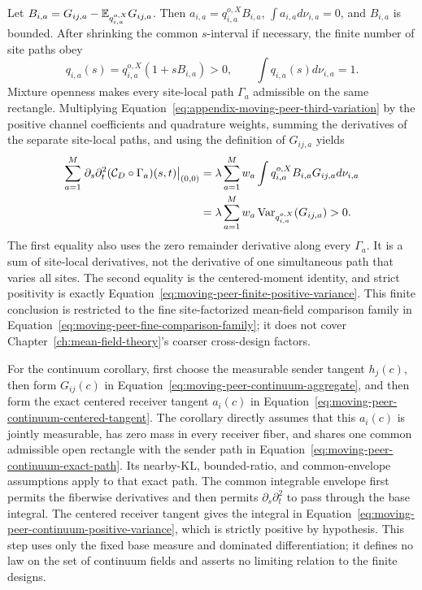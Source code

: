 Let \(B_{i,a}=G_{ij,a}-\mathbb E_{q_{i,a}^{o,X}}G_{ij,a}\). Then \(a_{i,a}=q_{i,a}^{o,X}B_{i,a}\), \(\int a_{i,a}d\nu_{i,a}=0\), and \(B_{i,a}\) is bounded. After shrinking the common \(s\)-interval if necessary, the finite number of site paths obey
\begin{equation}
q_{i,a}(s)=q_{i,a}^{o,X}(1+sB_{i,a})>0,
\qquad
\int q_{i,a}(s)d\nu_{i,a}=1.
\label{eq:appendix-moving-peer-positive-mixture}
\end{equation}
Mixture openness makes every site-local path \(\Gamma_a\) admissible on the same rectangle. Multiplying Equation~\eqref{eq:appendix-moving-peer-third-variation} by the positive channel coefficients and quadrature weights, summing the derivatives of the separate site-local paths, and using the definition of \(G_{ij,a}\) yields
\begin{align}
\sum_{a=1}^{M}\left.\partial_s\partial_t^2
(\mathcal C_D\circ\Gamma_a)(s,t)\right|_{(0,0)}
&=\lambda\sum_{a=1}^{M}w_a
\int q_{i,a}^{o,X}B_{i,a}G_{ij,a}d\nu_{i,a}\notag\\
&=\lambda\sum_{a=1}^{M}w_a
\operatorname{Var}_{q_{i,a}^{o,X}}(G_{ij,a})>0.
\label{eq:appendix-moving-peer-variance-identity}
\end{align}
The first equality also uses the zero remainder derivative along every \(\Gamma_a\). It is a sum of site-local derivatives, not the derivative of one simultaneous path that varies all sites. The second equality is the centered-moment identity, and strict positivity is exactly Equation~\eqref{eq:moving-peer-finite-positive-variance}. This finite conclusion is restricted to the fine site-factorized mean-field comparison family in Equation~\eqref{eq:moving-peer-fine-comparison-family}; it does not cover Chapter~\ref{ch:mean-field-theory}'s coarser cross-design factors.

For the continuum corollary, first choose the measurable sender tangent \(h_j(c)\), then form \(G_{ij}(c)\) in Equation~\eqref{eq:moving-peer-continuum-aggregate}, and then form the exact centered receiver tangent \(a_i(c)\) in Equation~\eqref{eq:moving-peer-continuum-centered-tangent}. The corollary directly assumes that this \(a_i(c)\) is jointly measurable, has zero mass in every receiver fiber, and shares one common admissible open rectangle with the sender path in Equation~\eqref{eq:moving-peer-continuum-exact-path}. Its nearby-KL, bounded-ratio, and common-envelope assumptions apply to that exact path. The common integrable envelope first permits the fiberwise derivatives and then permits \(\partial_s\partial_t^2\) to pass through the base integral. The centered receiver tangent gives the integral in Equation~\eqref{eq:moving-peer-continuum-positive-variance}, which is strictly positive by hypothesis. This step uses only the fixed base measure and dominated differentiation; it defines no law on the set of continuum fields and asserts no limiting relation to the finite designs.

